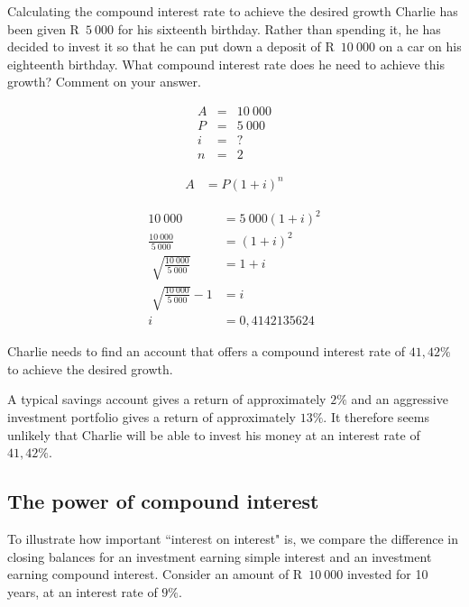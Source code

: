 \begin{wex}{Calculating the compound interest rate to achieve the desired growth}{
    Charlie has been given R~$5~000$ for his sixteenth birthday. Rather than spending it, he has decided to invest it so that he can put down a deposit of R~$10~000$ on a car on his eighteenth birthday. What compound interest rate does he need to achieve this growth? Comment on your answer.}{
    
    \begin{eqnarray*}
	A &=& 10~000\\
	P &=& 5~000\\
	i &=& ?\\
	n &=& 2
    \end{eqnarray*}

    \begin{align*}
	A &= P(1 + i)^n
    \end{align*}

    \begin{align*}
	10~000 &= 5~000(1 + i)^2\\
	\frac{10~000}{5~000}&= (1 +i)^2\\[5pt]
	\sqrt[]{\frac{10~000}{5~000}} &= 1 + i\\[5pt]
	\sqrt[]{\frac{10~000}{5~000}} - 1 &= i\\
	i &= 0,4142135624
    \end{align*}

    Charlie needs to find an account that offers a compound interest rate of $41,42\%$ to achieve the desired growth.\par
A typical savings account gives a return of approximately $2\%$ and an aggressive investment portfolio gives a return of approximately $13\%$. It therefore seems unlikely that Charlie will be able to invest his money at an interest rate of $41,42\%$.
    }
\end{wex}


\subsection{The power of compound interest}

To illustrate how important “interest on interest" is, we compare the difference in closing balances for an investment earning simple interest and an investment earning compound interest. Consider an amount of R~$10~000$ invested for 10 years, at an interest rate of $9\%$.\par

